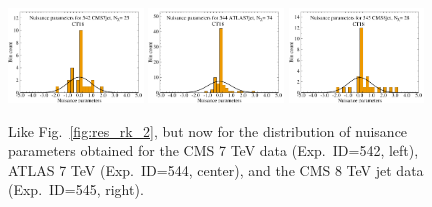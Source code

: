 \begin{figure}[htbp]
\includegraphics[width=0.32\textwidth]{./fig/SuppMat/rk_his_CT18-542__4_ect.pdf}
\includegraphics[width=0.32\textwidth]{./fig/SuppMat/rk_his_CT18-544__4_ect.pdf}
\includegraphics[width=0.32\textwidth]{./fig/SuppMat/rk_his_CT18-545__4_ect.pdf}
\caption{Like Fig.~\ref{fig:res_rk_2}, but now for the distribution of nuisance parameters obtained for the CMS 7 TeV data (Exp.~ID=542, left), ATLAS 7 TeV
	(Exp.~ID=544, center), and the CMS 8 TeV jet data (Exp.~ID=545, right).
}
\label{fig:res_rk_4}
\end{figure}


